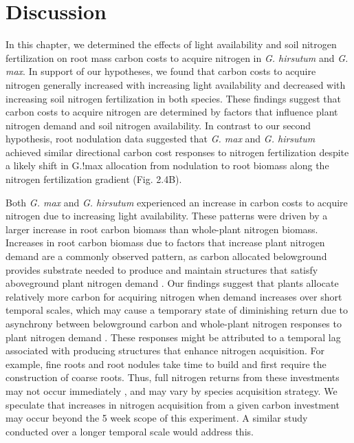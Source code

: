\section{Discussion}
In this chapter, we determined the effects of light availability and soil nitrogen fertilization on root mass carbon costs to acquire nitrogen in \textit{G. hirsutum} and \textit{G. max}. In support of our hypotheses, we found that carbon costs to acquire nitrogen generally increased with increasing light availability and decreased with increasing soil nitrogen fertilization in both species. These findings suggest that carbon costs to acquire nitrogen are determined by factors that influence plant nitrogen demand and soil nitrogen availability. In contrast to our second hypothesis, root nodulation data suggested that \textit{G. max} and \textit{G. hirsutum} achieved similar directional carbon cost responses to nitrogen fertilization despite a likely shift in G.!max allocation from nodulation to root biomass along the nitrogen fertilization gradient (Fig. 2.4B).

Both \textit{G. max} and \textit{G. hirsutum} experienced an increase in carbon costs to acquire nitrogen due to increasing light availability. These patterns were driven by a larger increase in root carbon biomass than whole-plant nitrogen biomass. Increases in root carbon biomass due to factors that increase plant nitrogen demand are a commonly observed pattern, as carbon allocated belowground provides substrate needed to produce and maintain structures that satisfy aboveground plant nitrogen demand . Our findings suggest that plants allocate relatively more carbon for acquiring nitrogen when demand increases over short temporal scales, which may cause a temporary state of diminishing return due to asynchrony between belowground carbon and whole-plant nitrogen responses to plant nitrogen demand . These responses might be attributed to a temporal lag associated with producing structures that enhance nitrogen acquisition. For example, fine roots  and root nodules  take time to build and first require the construction of coarse roots. Thus, full nitrogen returns from these investments may not occur immediately , and may vary by species acquisition strategy. We speculate that increases in nitrogen acquisition from a given carbon investment may occur beyond the 5 week scope of this experiment. A similar study conducted over a longer temporal scale would address this.

